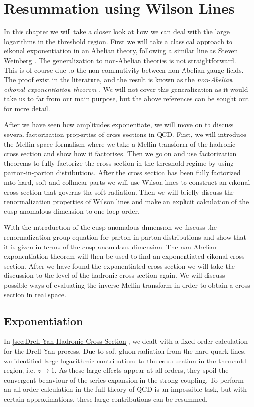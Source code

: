 \chapter{Resummation using Wilson Lines}\label{chap:Resummation in QCD}
In this chapter we will take a closer look at how we can deal with the large logarithms in the threshold region. First we will take a classical approach to eikonal exponentiation in an Abelian theory, following a similar line as Steven Weinberg \cite{Weinberg:1972rt}. The generalization to non-Abelian theories is not straightforward. This is of course due to the non-commutivity between non-Abelian gauge fields. The proof exist in the literature, and the result is known as the \emph{non-Abelian eikonal exponentiation theorem} \cite{Gatheral:1983cz,Frenkel:1984pz,Laenen:2008gt}. We will not cover this generalization as it would take us to far from our main purpose, but the above references can be sought out for more detail. 

After we have seen how amplitudes exponentiate, we will move on to discuss several factorization properties of cross sections in QCD. First, we will introduce the Mellin space formalism where we take a Mellin transform of the hadronic cross section and show how it factorizes. Then we go on and use factorization theorems to fully factorize the cross section in the threshold regime by using parton-in-parton distributions. After the cross section has been fully factorized into hard, soft and collinear parts we will use Wilson lines to construct an eikonal cross section that governs the soft radiation. Then we will briefly discuss the renormalization properties of Wilson lines and make an explicit calculation of the cusp anomalous dimension to one-loop order. 

With the introduction of the cusp anomalous dimension we discuss the renormalization group equation for parton-in-parton distributions and show that it is given in terms of the cusp anomalous dimension. The non-Abelian exponentiation theorem will then be used to find an exponentiated eikonal cross section. After we have found the exponentiated cross section we will take the discussion to the level of the hadronic cross section again. We will discuss possible ways of evaluating the inverse Mellin transform in order to obtain a cross section in real space. 


\section{Exponentiation}\label{sec:exponentiation}
In \cref{sec:Drell-Yan Hadronic Cross Section}, we dealt with a fixed order calculation for the Drell-Yan process. Due to soft gluon radiation from the hard quark lines, we identified large logarithmic contributions to the cross-section in the threshold region, i.e. $z\rightarrow 1$. As these large effects appear at all orders, they spoil the convergent behaviour of the series expansion in the strong coupling. To perform an all-order calculation in the full theory of QCD is an impossible task, but with certain approximations, these large contributions can be resummed.


